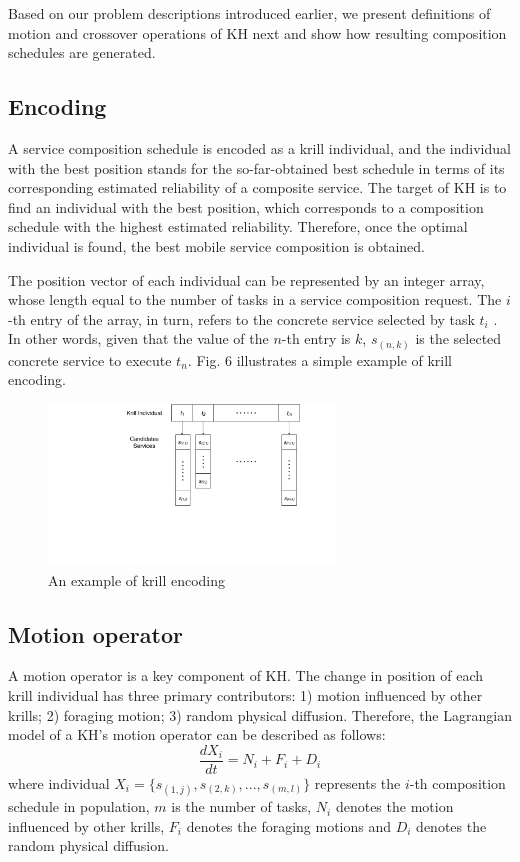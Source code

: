 \documentclass[journal]{IEEEtran}
\begin{document}
Based on our problem descriptions introduced earlier, we present definitions of motion and crossover operations of KH next and show how resulting composition schedules are generated.

\subsection{Encoding}
A service composition schedule is encoded as a krill individual, and the individual with the best position stands for the so-far-obtained best schedule in terms of its corresponding estimated reliability of a composite service. The target of KH is to find an individual with the best position, which corresponds to a composition schedule with the highest estimated reliability. Therefore, once the optimal individual is found, the best mobile service composition is obtained.

The position vector of each individual can be represented by an integer array, whose length equal to the number of tasks in a service composition request. The $i$-th entry of the array, in turn, refers to the concrete service selected by task $t_i$ . In other words, given that the value of the $n$-th entry is $k$, $s_{(n,k)}$ is the selected concrete service to execute $t_n$. Fig. 6 illustrates a simple example of  krill encoding.

\begin{figure}[!t]
\centering
\includegraphics[width=3in]{./img/pic6.pdf}
\caption{An example of krill encoding}
\label{Krill encoding}
\end{figure}

\subsection{Motion operator}

A motion operator is a key component of KH. The change in position of each krill individual has three primary contributors: 1) motion influenced by other krills; 2) foraging motion; 3) random physical diffusion. Therefore, the Lagrangian model of a KH's motion operator can be described as follows:
\begin{equation}
\frac{dX_i}{dt} =N_i+F_i+D_i
\end{equation}
where individual $X_i = \{s_{(1,j)}, s_{(2,k)}, . . . , s_{(m,l)}\}$ represents the $i$-th composition schedule in population, $m$ is the number of tasks, $N_i$ denotes the motion influenced by other krills, $F_i$ denotes the foraging motions and $D_i$ denotes the random physical diffusion.
\end{document}
